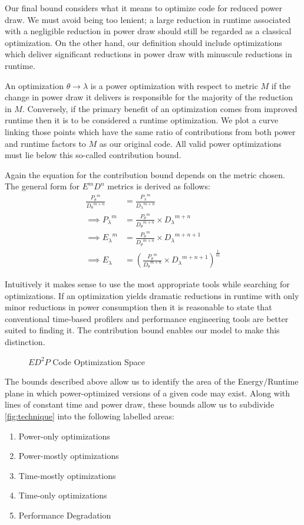 Our final bound considers what it means to optimize code for reduced power draw. We must avoid being too lenient; a large reduction in runtime associated with a negligible reduction in power draw should still be regarded as a classical optimization. On the other hand, our definition should include optimizations which deliver significant reductions in power draw with minuscule reductions in runtime. 

An optimization $\theta \to \lambda$ is a power optimization with respect to metric $M$ if the change in power draw it delivers is responsible for the majority of the reduction in $M$. Conversely, if the primary benefit of an optimization comes from improved runtime then it is to be considered a runtime optimization. We plot a curve linking those points which have the same ratio of contributions from both power and runtime factors to $M$ as our original code. All valid power optimizations must lie below this so-called contribution bound. 

Again the equation for the contribution bound depends on the metric chosen.
The general form for $E^mD^n$ metrics is derived as follows:
\begin{align}
\frac{{P_{\theta}}^m}{{D_{\theta}}^{m+n}} &= \frac{{P_{\lambda}}^m}{{D_{\lambda}}^{m+n}} \nonumber \\
\implies {P_{\lambda}}^m &= \frac{{P_{\theta}}^m}{{D_{\theta}}^{m+n}} \times {D_\lambda}^{m+n} \nonumber \\ 
\implies {E_{\lambda}}^m &= \frac{{P_{\theta}}^m}{{D_{\theta}}^{m+n}} \times {D_\lambda}^{m+n+1} \nonumber \\ 
\implies E_{\lambda} &= (\frac{{P_{\theta}}^m}{{D_{\theta}}^{m+n}} \times {D_\lambda}^{m+n+1})^{\frac{1}{m}} 
\end{align}

Intuitively it makes sense to use the most appropriate tools while searching for optimizations.  If an optimization yields dramatic reductions in runtime with only minor reductions in power consumption then it is reasonable to state that conventional time-based profilers and performance engineering tools are better suited to finding it. The contribution bound enables our model to make this distinction.

\begin{figure}
\centering

\caption{$ED^2P$ Code Optimization Space}
\label{fig:technique}
\end{figure}
The bounds described above allow us to identify the area of the Energy/Runtime plane in which power-optimized versions of a given code may exist. 
Along with lines of constant time and power draw, these bounds allow us to subdivide \autoref{fig:technique} into the following labelled areas:
\begin{enumerate}
\item Power-only optimizations
\item Power-mostly optimizations
\item Time-mostly optimizations
\item Time-only optimizations
\item Performance Degradation
\end{enumerate}


